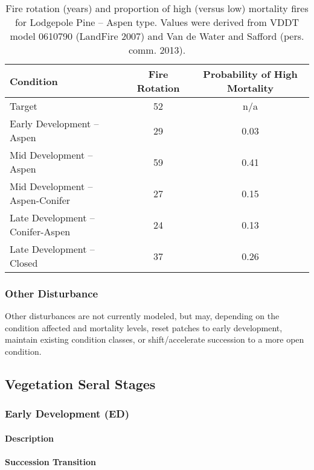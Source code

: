 \begin{table}[]
\centering
\caption{Fire rotation (years) and proportion of high (versus low) mortality fires for Lodgepole Pine – Aspen type. Values were derived from VDDT model 0610790 (LandFire 2007) and Van de Water and Safford (pers. comm. 2013).}
\label{tab:lpnaspdesc_fire}
\begin{tabular}{@{}lcc@{}}
\toprule
\textbf{Condition}               & \textbf{Fire Rotation} & \textbf{Probability of High Mortality} \\ \midrule
Target                           & 52     & n/a        \\
Early Development – Aspen        & 29     & 0.03       \\
Mid Development – Aspen          & 59     & 0.41       \\
Mid Development – Aspen-Conifer  & 27     & 0.15       \\
Late Development – Conifer-Aspen & 24     & 0.13       \\
Late Development – Closed        & 37     & 0.26       \\ \bottomrule
\end{tabular}
\end{table}

\subsubsection{Other Disturbance}
Other disturbances are not currently modeled, but may, depending on the condition affected and mortality levels, reset patches to early development, maintain existing condition classes, or shift/accelerate succession to a more open condition. 

\subsection{Vegetation Seral Stages}


\subsubsection{Early Development (ED)}

\paragraph{Description}

\paragraph{Succession Transition}


